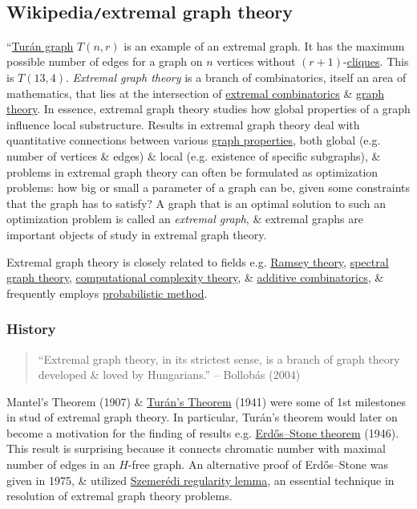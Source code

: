 \documentclass{article}
\begin{document}
\subsection{Wikipedia{\tt/}extremal graph theory}
``{\sf\href{https://en.wikipedia.org/wiki/Tur%C3%A1n_graph}{Tur\'an graph} $T(n,r)$ is an example of an extremal graph. It has the maximum possible number of edges for a graph on $n$ vertices without $(r + 1)$-\href{https://en.wikipedia.org/wiki/Clique_(graph_theory)}{cliques}. This is $T(13,4)$.} {\it Extremal graph theory} is a branch of combinatorics, itself an area of mathematics, that lies at the intersection of \href{https://en.wikipedia.org/wiki/Extremal_combinatorics}{extremal combinatorics} \& \href{https://en.wikipedia.org/wiki/Graph_theory}{graph theory}. In essence, extremal graph theory studies how global properties of a graph influence local substructure. Results in extremal graph theory deal with quantitative connections between various \href{https://en.wikipedia.org/wiki/Graph_property}{graph properties}, both global (e.g. number of vertices \& edges) \& local (e.g. existence of specific subgraphs), \& problems in extremal graph theory can often be formulated as optimization problems: how big or small a parameter of a graph can be, given some constraints that the graph has to satisfy? A graph that is an optimal solution to such an optimization problem is called an {\it extremal graph}, \& extremal graphs are important objects of study in extremal graph theory.

Extremal graph theory is closely related to fields e.g. \href{https://en.wikipedia.org/wiki/Ramsey_theory}{Ramsey theory}, \href{https://en.wikipedia.org/wiki/Spectral_graph_theory}{spectral graph theory}, \href{https://en.wikipedia.org/wiki/Computational_complexity_theory}{computational complexity theory}, \& \href{https://en.wikipedia.org/wiki/Additive_combinatorics}{additive combinatorics}, \& frequently employs \href{https://en.wikipedia.org/wiki/Probabilistic_method}{probabilistic method}.

\subsubsection{History}

\begin{quote}
	``Extremal graph theory, in its strictest sense, is a branch of graph theory developed \& loved by Hungarians.'' -- {\sc Bollob\'as} (2004)
\end{quote}
Mantel's Theorem (1907) \& \href{https://en.wikipedia.org/wiki/Tur%C3%A1n%27s_theorem}{Tur\'an's Theorem} (1941) were some of 1st milestones in stud of extremal graph theory. In particular, Tur\'an's theorem would later on become a motivation for the finding of results e.g. \href{https://en.wikipedia.org/wiki/Erd%C5%91s%E2%80%93Stone_theorem}{Erd\H{o}s--Stone theorem} (1946). This result is surprising because it connects chromatic number with maximal number of edges in an $H$-free graph. An alternative proof of Erd\H{o}s--Stone was given in 1975, \& utilized \href{https://en.wikipedia.org/wiki/Szemer%C3%A9di_regularity_lemma}{Szemer\'edi regularity lemma}, an essential technique in resolution of extremal graph theory problems.
\end{document}
